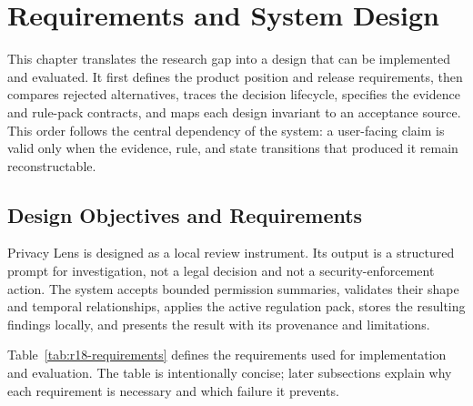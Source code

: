 \section{Requirements and System Design}

This chapter translates the research gap into a design that can be implemented and evaluated. It first defines the product position and release requirements, then compares rejected alternatives, traces the decision lifecycle, specifies the evidence and rule-pack contracts, and maps each design invariant to an acceptance source. This order follows the central dependency of the system: a user-facing claim is valid only when the evidence, rule, and state transitions that produced it remain reconstructable.

\subsection{Design Objectives and Requirements}

Privacy Lens is designed as a local review instrument. Its output is a structured prompt for investigation, not a legal decision and not a security-enforcement action. The system accepts bounded permission summaries, validates their shape and temporal relationships, applies the active regulation pack, stores the resulting findings locally, and presents the result with its provenance and limitations.

Table~\ref{tab:r18-requirements} defines the requirements used for implementation and evaluation. The table is intentionally concise; later subsections explain why each requirement is necessary and which failure it prevents.

